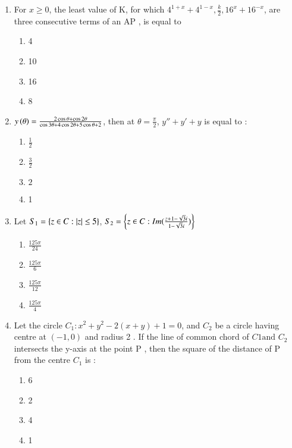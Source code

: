 \documentclass[journal]{IEEEtran}
\begin{document}
\begin{enumerate}
    \item For $x\geq 0$, the least value of K, for which $4^{1+x} +4^{1-x}, \frac{k}{2}, 16^x +16^{-x}$, are three consecutive terms of an AP , is equal to
\begin{multicols}{4}
            \begin{enumerate}
              \item 4
              \item 10
              \item 16
              \item 8
            \end{enumerate}
        \end{multicols}
    \item $y\left(\theta\right)=\frac{2\cos{\theta}+\cos{2\theta}}{\cos{3\theta}+4\cos{2\theta}+5\cos{\theta}+2}$, then at $\theta=\frac{\pi}{2}$, $y''+y'+y$ is equal to :
    \begin{multicols}{4}
            \begin{enumerate}
              \item $\frac{1}{2}$
              \item $\frac{3}{2}$
              \item $2$
              \item 1
            \end{enumerate}
        \end{multicols}
    \item Let $S_1=\left\{z \in C: \left\vert z\right\vert\leq 5\right\}$, $S_2=\left\{z \in C :Im(\frac{z+1-\sqrt{3}i}{1-\sqrt{3}i})\right\}$
    \begin{multicols}{4}
            \begin{enumerate}
              \item $\frac{125\pi}{24}$
              \item $\frac{125\pi}{6}$
              \item $\frac{125\pi}{12}$
              \item $\frac{125\pi}{4}$
            \end{enumerate}
        \end{multicols}
     
    \item Let the circle $C_1: x^2+y^2-2(x+y)+1=0$, and $C_2$ be a circle having centre at $(-1,0)$ and radius 2 . If the line of common chord of $C1 \text{and } C_2$ intersects the y-axis at the point P , then the square of the distance of P from the centre $C_1$ is :
    \begin{multicols}{4}
            \begin{enumerate}
              \item 6
              \item 2
              \item 4
              \item 1
            \end{enumerate}
        \end{multicols}
    

\end{enumerate}
\end{document}
